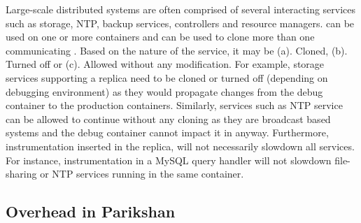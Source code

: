 Large-scale distributed systems are often comprised of several interacting services such as storage, NTP, backup services, controllers and resource managers.
\parikshan can be used on one or more containers and can be used to clone more than one communicating .
Based on the nature of the service, it may be (a). Cloned, (b). Turned off or (c). Allowed without any modification.
For example, storage services supporting a replica need to be cloned or turned off (depending on debugging environment) as they would propagate changes from the debug container to the production containers.
Similarly, services such as NTP service can be allowed to continue without any cloning as they are broadcast based systems and the debug container cannot impact it in anyway.
Furthermore, instrumentation inserted in the replica, will not necessarily slowdown all services.
For instance, instrumentation in a MySQL query handler will not slowdown file-sharing or NTP services running in the same container.

\subsection{Overhead in Parikshan}
\label{sec:parikshanOverhead}

